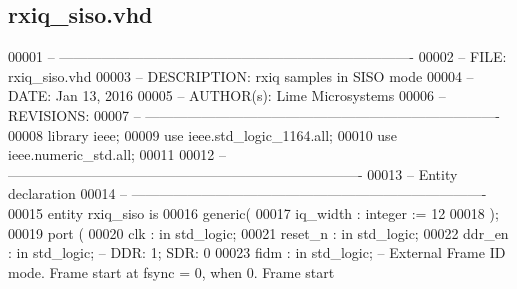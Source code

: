 \subsection{rxiq\+\_\+siso.\+vhd}
\label{rxiq__siso_8vhd_source}

\begin{DoxyCode}
00001 \textcolor{keyword}{-- ---------------------------------------------------------------------------- }
00002 \textcolor{keyword}{-- FILE:    rxiq\_siso.vhd}
00003 \textcolor{keyword}{-- DESCRIPTION: rxiq samples in SISO mode}
00004 \textcolor{keyword}{-- DATE:    Jan 13, 2016}
00005 \textcolor{keyword}{-- AUTHOR(s):   Lime Microsystems}
00006 \textcolor{keyword}{-- REVISIONS:}
00007 \textcolor{keyword}{-- ---------------------------------------------------------------------------- }
00008 \textcolor{vhdlkeyword}{library }\textcolor{keywordflow}{ieee};
00009 \textcolor{vhdlkeyword}{use }ieee.std\_logic\_1164.\textcolor{keywordflow}{all};
00010 \textcolor{vhdlkeyword}{use }ieee.numeric\_std.\textcolor{keywordflow}{all};
00011 
00012 \textcolor{keyword}{-- ----------------------------------------------------------------------------}
00013 \textcolor{keyword}{-- Entity declaration}
00014 \textcolor{keyword}{-- ----------------------------------------------------------------------------}
00015 \textcolor{keywordflow}{entity }rxiq_siso \textcolor{keywordflow}{is}
00016    \textcolor{keywordflow}{generic}\textcolor{vhdlchar}{(}
00017       \textcolor{vhdlchar}{iq_width}                  \textcolor{vhdlchar}{:} \textcolor{comment}{integer} \textcolor{vhdlchar}{:=} \textcolor{vhdllogic}{}\textcolor{vhdllogic}{12}
00018    \textcolor{vhdlchar}{)};
00019   \textcolor{keywordflow}{port} \textcolor{vhdlchar}{(}
00020       \textcolor{vhdlchar}{clk}         \textcolor{vhdlchar}{:} \textcolor{keywordflow}{in} \textcolor{comment}{std\_logic};
00021       \textcolor{vhdlchar}{reset_n}     \textcolor{vhdlchar}{:} \textcolor{keywordflow}{in} \textcolor{comment}{std\_logic};
00022       \textcolor{vhdlchar}{ddr_en}       \textcolor{vhdlchar}{:} \textcolor{keywordflow}{in} \textcolor{comment}{std\_logic};\textcolor{keyword}{ -- DDR: 1; SDR: 0}
00023       \textcolor{vhdlchar}{fidm}         \textcolor{vhdlchar}{:} \textcolor{keywordflow}{in} \textcolor{comment}{std\_logic};\textcolor{keyword}{ -- External Frame ID mode. Frame start at fsync = 0, when 0. Frame start
}
\end{DoxyCode}
